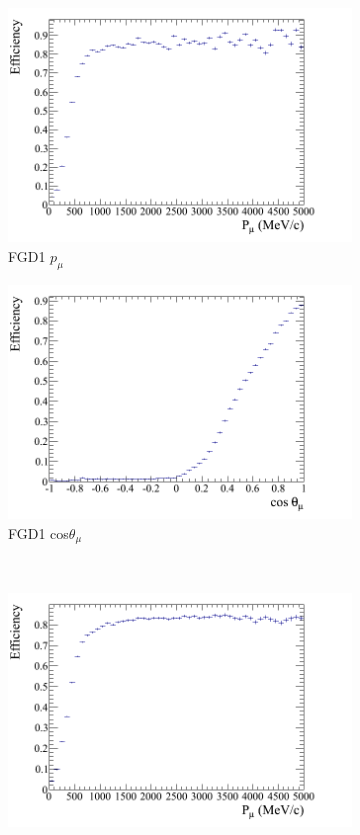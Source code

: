 \begin{figure}
\centering
\begin{subfigure}{.49\textwidth}
  \centering
  \includegraphics[width=1.0\linewidth]{figs/effmomfgd1numu}
  \caption{FGD1 $p_{\mu}$}
\end{subfigure}
\begin{subfigure}{.49\textwidth}
  \centering
  \includegraphics[width=1.0\linewidth]{figs/effcosfgd1numu}
  \caption{FGD1 cos$\theta_{\mu}$}
\end{subfigure} \\
\begin{subfigure}{.49\textwidth}
  \centering
  \includegraphics[width=1.0\linewidth]{figs/effmomfgd2numu}

\end{subfigure}
\end{figure}
